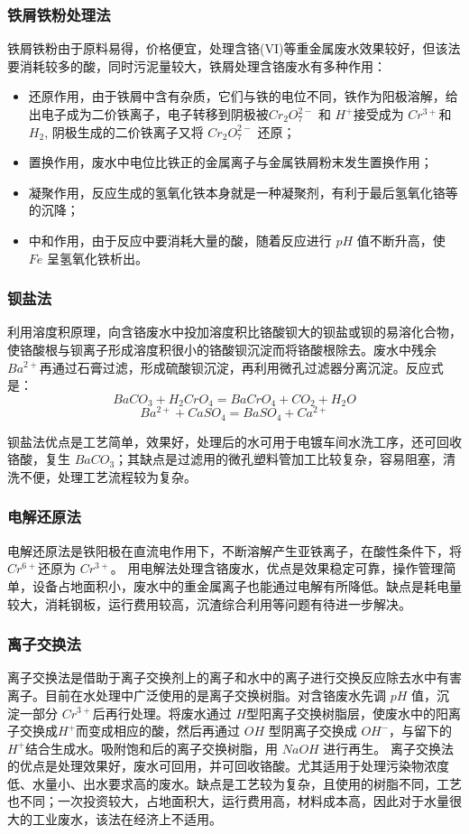 \documentclass[UTF8,a4paper,11pt,twocolumn]{ctexart}
\begin{document}
\subsubsection{铁屑铁粉处理法}
铁屑铁粉由于原料易得，价格便宜，处理含铬(VI)等重金属废水效果较好，但该法要消耗较多的酸，同时污泥量较大，铁屑处理含铬废水有多种作用：

\begin{itemize}
\item 还原作用，由于铁屑中含有杂质，它们与铁的电位不同，铁作为阳极溶解，给出电子成为二价铁离子，电子转移到阴极被$Cr_2O_7^{2-}$ 和 $H^+$接受成为 $Cr^{3+}$和 $H_2$, 阴极生成的二价铁离子又将 $Cr_2O_7^{2-}$ 还原；
\item 置换作用，废水中电位比铁正的金属离子与金属铁屑粉末发生置换作用；
\item 凝聚作用，反应生成的氢氧化铁本身就是一种凝聚剂，有利于最后氢氧化铬等的沉降；
\item 中和作用，由于反应中要消耗大量的酸，随着反应进行 $pH$ 值不断升高，使 $Fe$ 呈氢氧化铁析出。 
\end{itemize}

\subsubsection{钡盐法}
利用溶度积原理，向含铬废水中投加溶度积比铬酸钡大的钡盐或钡的易溶化合物，使铬酸根与钡离子形成溶度积很小的铬酸钡沉淀而将铬酸根除去。废水中残余 $Ba^{2+}$再通过石膏过滤，形成硫酸钡沉淀，再利用微孔过滤器分离沉淀。反应式是： 
{\small $$BaCO_3 + H_2CrO_4= BaCrO_4+ CO_2 + H_2O$$}
{\small $$Ba^{2+} +CaSO_4 = BaSO_4 + Ca^{2+}$$}

钡盐法优点是工艺简单，效果好，处理后的水可用于电镀车间水洗工序，还可回收铬酸，复生 $BaCO_3$；其缺点是过滤用的微孔塑料管加工比较复杂，容易阻塞，清洗不便，处理工艺流程较为复杂。 

\subsubsection{电解还原法}
电解还原法是铁阳极在直流电作用下，不断溶解产生亚铁离子，在酸性条件下，将 $Cr^{6+}$还原为 $Cr^{3+}$。 用电解法处理含铬废水，优点是效果稳定可靠，操作管理简单，设备占地面积小，废水中的重金属离子也能通过电解有所降低。缺点是耗电量较大，消耗钢板，运行费用较高，沉渣综合利用等问题有待进一步解决。 

\subsubsection{离子交换法}
离子交换法是借助于离子交换剂上的离子和水中的离子进行交换反应除去水中有害离子。目前在水处理中广泛使用的是离子交换树脂。对含铬废水先调 $pH$ 值，沉淀一部分 $Cr^{3+}$后再行处理。将废水通过 $H$型阳离子交换树脂层，使废水中的阳离子交换成$H^+$而变成相应的酸，然后再通过 $OH$ 型阴离子交换成 $OH^-$，与留下的$H^+$结合生成水。吸附饱和后的离子交换树脂，用 $NaOH$ 进行再生。 离子交换法的优点是处理效果好，废水可回用，并可回收铬酸。尤其适用于处理污染物浓度低、水量小、出水要求高的废水。缺点是工艺较为复杂，且使用的树脂不同，工艺也不同；一次投资较大，占地面积大，运行费用高，材料成本高，因此对于水量很大的工业废水，该法在经济上不适用。
\end{document}
